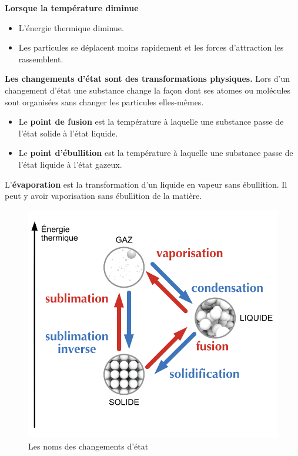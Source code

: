 \documentclass[
  11pt,
  a4paper,
  openany]{book}
\providecommand{\tightlist}{%
  \setlength{\itemsep}{0pt}\setlength{\parskip}{0pt}}
\begin{document}
\textbf{Lorsque la température diminue}

\begin{itemize}
\tightlist
\item
  L'énergie thermique diminue.
\item
  Les particules se déplacent moins rapidement et les forces d'attraction les rassemblent.
\end{itemize}

\textbf{Les changements d'état sont des transformations physiques.} Lors d'un changement d'état une substance change la façon dont ses atomes ou molécules sont organisées sans changer les particules elles-mêmes.

\begin{itemize}
\tightlist
\item
  Le \textbf{point de fusion} est la température à laquelle une substance passe de l'état solide à l'état liquide.
\item
  Le \textbf{point d'ébullition} est la température à laquelle une substance passe de l'état liquide à l'état gazeux.
\end{itemize}

L'\textbf{évaporation} est la transformation d'un liquide en vapeur sans ébullition. Il peut y avoir vaporisation sans ébullition de la matière.

\newpage

\begin{figure}

{\centering \includegraphics[width=0.45\linewidth]{images/chgt-etats} 

}

\caption{Les noms des changements d'état}\label{fig:chgt-etats}
\end{figure}
\end{document}
